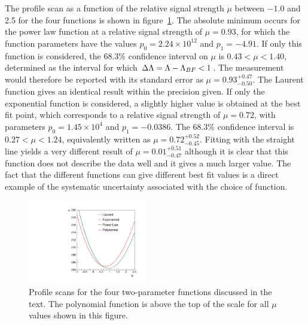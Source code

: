 The profile scan as a function of the relative signal strength $\mu$
between $-1.0$ and 2.5
for the four functions is shown in
figure~\ref{fig:functions:profiles}.
The absolute minimum occurs for the power law function at a relative signal
strength of $\mu = 0.93$, for which the function parameters have the values
$p_0 = 2.24\times 10^{12}$ and $p_1 = -4.91$.
If only this function is considered,
the 68.3\% confidence interval on $\mu$ is
$0.43 < \mu < 1.40 $, determined as the interval for which $\Delta{\rm \ensuremath{\Lambda}} = \Lambda - \Lambda_{BF} < 1$.
The measurement would therefore be reported with its standard error as $\mu=0.93^{+0.47}_{-0.50}$. The Laurent function gives an identical result within the precision given.
If only the exponential function is considered, a slightly higher
\nll value is obtained
at the best fit point, which corresponds to a relative signal strength of $\mu = 0.72$, with parameters $p_0 = 1.45 \times 10^4$ and $p_1 = -0.0386$.
The 68.3\% confidence interval is
$0.27 < \mu < 1.24 $, equivalently written as $\mu = 0.72^{+0.52}_{-0.45}$.
Fitting with the straight line yields a very different result of
$\mu = 0.01^{+0.51}_{-0.47}$
although it is clear that this function does not describe the data well and it
gives a much larger \nll value.
The fact that the different functions can give different best fit values
is a direct example of the systematic uncertainty associated
with the choice of function.
%
\begin{figure}[tbp]
\centering
\includegraphics[width=0.46\textwidth]{functions/Profiles.pdf}
\caption{Profile \nll scans for the four two-parameter
functions discussed in the text.
The polynomial function is above the top of the \nll scale for all
$\mu$ values shown in this figure. }
\label{fig:functions:profiles}
\end{figure}

